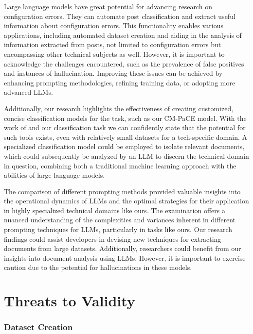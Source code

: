 \documentclass[english,bachelor]{swsLeipzig}
\begin{document}
Large language models have great potential for advancing research on configuration errors. They 
can automate post classification and extract useful information about configuration errors. This functionality enables various applications, including automated dataset creation and aiding in the analysis of information extracted from posts, not limited to configuration errors but encompassing other technical subjects as well. However, it is important to acknowledge the challenges encountered, such as the prevalence of false positives and instances of hallucination. Improving these issues can be achieved by enhancing prompting methodologies, refining training data, or adopting more advanced LLMs.

Additionally, our research highlights the effectiveness of creating customized, concise classification 
models for the task, such as our CM-PaCE model. With the work of \citet{tian:2020} and our classification task we can confidently state that the potential for such tools exists, even with relatively small datasets for a tech-specific domain. A specialized classification model could be employed to isolate relevant documents, which could subsequently be analyzed by an LLM to discern the technical domain in question, combining both a traditional machine learning approach with the abilities of large language models.

The comparison of different prompting methods provided valuable insights into the operational dynamics 
of LLMs and the optimal strategies for their application in highly specialized technical domains like ours. The examination offers a nuanced understanding of the complexities and variances inherent in different prompting techniques for LLMs, particularly in tasks like ours. Our research findings could assist developers in devising new techniques for extracting documents from large datasets. Additionally, researchers could benefit from our insights into document analysis using LLMs. However, it is important to exercise caution due to the potential for hallucinations in these models.

\section{Threats to Validity}

\subsubsection{Dataset Creation}
\end{document}
